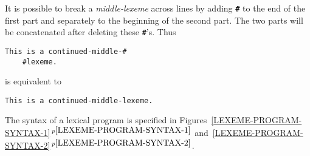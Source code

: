 \documentclass[12pt]{article}
\newcommand{\TT}[1]{{\tt \bfseries #1}}
\newcommand{\itemref}[1]{\ref{#1}$\,^{p\pageref{#1}}$}
\newenvironment{indpar}[1][0.3in]%
	{\begin{list}{}%
		     {\setlength{\itemsep}{0in}%
		      \setlength{\topsep}{0in}%
		      \setlength{\parsep}{1ex}%
		      \setlength{\labelwidth}{#1}%
		      \setlength{\leftmargin}{#1}%
		      \addtolength{\leftmargin}{\labelsep}}%
	 \item}%
	{\end{list}}
\begin{document}
It is possible to break a {\em middle-lexeme} across lines by
adding \TT{\#} to the end of the first part and separately
to the beginning of the second part.  The two parts will be
concatenated after deleting these \TT{\#}'s.  Thus
\begin{indpar}\begin{verbatim}
This is a continued-middle-#
    #lexeme.
\end{verbatim}\end{indpar}
is equivalent to
\begin{indpar}\begin{verbatim}
This is a continued-middle-lexeme.
\end{verbatim}\end{indpar}

The syntax of a lexical program is specified in
Figures~\itemref{LEXEME-PROGRAM-SYNTAX-1}
and~\itemref{LEXEME-PROGRAM-SYNTAX-2}.
\end{document}
